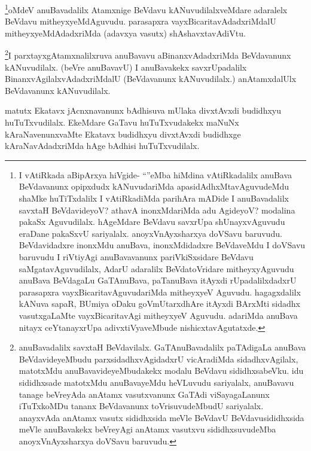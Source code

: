 \begin{artha}
\footnote{I vAtiRkada aBipArxya hiVgide- ``\stext''eMba hiMdina vAtiRkadalilx anuBava BeVdavanunx opipxdudx kANuvudariMda apasidAdhxMtavAguvudeMdu shaMke huTiTxdalilx I vAtiRkadiMda parihAra mADide I anuBavadalilx savxtaH BeVdavideyoV? athavA inonxMdariMda adu AgideyoV? modalina pakaSx Aguvudilalx. hAgeMdare BeVdavu savxrUpa shUnayxvAguvudu eraDane pakaSxvU sariyalalx. anoyxVnAyxsharxya doVSavu baruvudu. BeVdavidadxre inonxMdu anuBava, inonxMdidadxre BeVdaveMdu I doVSavu baruvudu I riVtiyAgi anuBavavanunx pariVkiSxsidare BeVdavu saMgatavAguvudilalx, AdarU adaralilx BeVdatoVridare mitheyxyAguvudu anuBava BeVdagaLu GaTAnuBava, paTanuBava itAyxdi rUpadalilxdadxrU parasapxra vayxBicaritavAguvudariMda mitheyxyeV Aguvudu. hagagxdalilx kANuva sapaR, BUmiya oDaku goVmUtarxdhAre itAyxdi BArxMti sidadhx vasutxgaLaMte vayxBicaritavAgi mitheyxyeV Aguvudu. adariMda anuBava nitayx ceYtanayxrUpa adivxtiVyaveMbude nishicxtavAgutatxde.}oMdeV anuBavadalilx Atamxnige BeVdavu kANuvudilalxveMdare adaralelx BeVdavu mitheyxyeMdAguvudu. parasapxra vayxBicaritavAdadxriMdalU mitheyxyeMdAdadxriMda (adavxya vasutx) shAshavxtavAdiVtu.
\end{artha}


\begin{artha}
\footnote{anuBavadalilx savxtaH BeVdavilalx. GaTAnuBavadalilx paTAdigaLa anuBava BeVdavideyeMbudu parxsidadhxvAgidadxrU vicAradiMda sidadhxvAgilalx, matotxMdu anuBavavideyeMbudakekx modalu BeVdavu sididhxsabeVku. idu sididhxsade matotxMdu anuBavayeMdu heVLuvudu sariyalalx, anuBavavu tanage beVreyAda anAtamx vasutxvanunx GaTAdi viSayagaLanunx iTuTxkoMDu tananx BeVdavanunx toVrisuvudeMbudU sariyalalx. anayxvAda anAtamx vasutx sididhxsida meVle BeVdavU BeVdavusididhxsida meVle anuBavakekx beVreyAgi anAtamx vasutxvu sididhxsuvudeMba anoyxVnAyxsharxya doVSavu baruvudu.}I parxtayxgAtamxnalilxruva anuBavavu aBinanxvAdadxriMda BeVdavanunx kANuvudilalx. (beVre anuBavavU) I anuBavakekx savxrUpadalilx BinanxvAgilalxvAdadxriMdalU (BeVdavanunx kANuvudilalx.) anAtamxdalUlx BeVdavanunx kANuvudilalx. 
\end{artha}


\begin{artha}
matutx Ekatavx jAcnxnavanunx bAdhisuva mUlaka divxtAvxdi budidhxyu huTuTxvudilalx. EkeMdare GaTavu huTuTxvudakekx maNuNx kAraNavenunxvaMte Ekatavx budidhxyu divxtAvxdi budidhxge kAraNavAdadxriMda hAge bAdhisi huTuTxvudilalx.
\end{artha}

